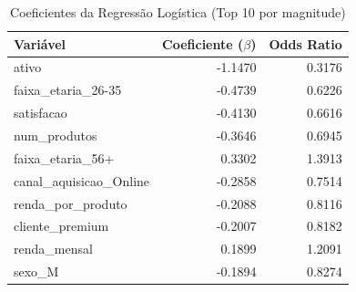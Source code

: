 \begin{table}[htbp]
\centering
\caption{Coeficientes da Regressão Logística (Top 10 por magnitude)}
\label{tab:coeficientes}
\label{tab:coef}
\small
\begin{tabular}{lrr}
\toprule
\textbf{Variável} & \textbf{Coeficiente ($\beta$)} & \textbf{Odds Ratio} \\
\midrule
ativo & -1.1470 & 0.3176 \\
faixa\_etaria\_26-35 & -0.4739 & 0.6226 \\
satisfacao & -0.4130 & 0.6616 \\
num\_produtos & -0.3646 & 0.6945 \\
faixa\_etaria\_56+ & 0.3302 & 1.3913 \\
canal\_aquisicao\_Online & -0.2858 & 0.7514 \\
renda\_por\_produto & -0.2088 & 0.8116 \\
cliente\_premium & -0.2007 & 0.8182 \\
renda\_mensal & 0.1899 & 1.2091 \\
sexo\_M & -0.1894 & 0.8274 \\
\bottomrule
\end{tabular}
\vspace{2mm}
\end{table}